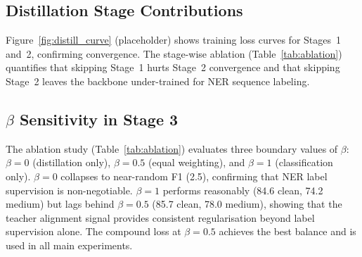 \subsection{Distillation Stage Contributions}

Figure~\ref{fig:distill_curve} (placeholder) shows training loss curves for
Stages~1 and~2, confirming convergence.  The stage-wise ablation
(Table~\ref{tab:ablation}) quantifies that skipping Stage~1 hurts Stage~2
convergence and that skipping Stage~2 leaves the backbone under-trained for
NER sequence labeling.

\subsection{$\beta$ Sensitivity in Stage 3}

The ablation study (Table~\ref{tab:ablation}) evaluates three boundary values
of $\beta$: $\beta{=}0$ (distillation only), $\beta{=}0.5$ (equal weighting),
and $\beta{=}1$ (classification only).
$\beta{=}0$ collapses to near-random F1 (2.5), confirming that NER label
supervision is non-negotiable.
$\beta{=}1$ performs reasonably (84.6 clean, 74.2 medium) but lags behind
$\beta{=}0.5$ (85.7 clean, 78.0 medium), showing that the teacher alignment
signal provides consistent regularisation beyond label supervision alone.
The compound loss at $\beta{=}0.5$ achieves the best balance and is used
in all main experiments.
